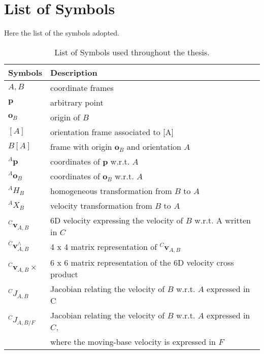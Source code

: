 
\chapter*{List of Symbols}
\label{ch:List_of_symbols}
Here the list of the symbols adopted.

\begin{table}[h]
    \centering
    \caption{List of Symbols used throughout the thesis.}
    \renewcommand{\arraystretch}{1.5} %
    \begin{tabular}{@{}l@{\hspace{3cm}}l@{}}
    \toprule
    \textbf{Symbols} & \textbf{Description} \\
    \midrule
    ${A,B}$  & coordinate frames \\
    ${\mathbf{p}}$ & arbitrary point \\
    ${\mathbf{o}_B}$  & origin of $B$ \\
    ${[A]}$ & orientation frame associated to [A] \\
    ${B[A]}$  & frame with origin $\mathbf{o}_B$ and orientation $A$ \\
    ${{}^{A}\mathbf{p}}$ & coordinates of $\mathbf{p}$ w.r.t. $A$ \\
    ${{}^{A}\mathbf{o}_B}$  & coordinates of $\mathbf{o}_B$ w.r.t. $A$ \\
    ${{}^{A} H_B}$  & homogeneous transformation from $B$ to $A$ \\
    ${{}^{A} X_B}$  & velocity transformation from $B$ to $A$ \\
    ${}^{C} \mathbf{v}_{A,B}$  & 6D velocity expressing the velocity of $B$ w.r.t. A written in $C$ \\
    ${}^{C} \mathbf{v}^{\wedge{}}_{A,B}$  & 4 x 4 matrix representation of ${}^{C} \mathbf{v}_{A,B}$  \\
    ${}^{C} \mathbf{v}_{A,B}\times$  & 6 x 6 matrix representation of the 6D velocity cross product  \\
    ${}^{C}J_{A,B}$  & Jacobian relating the velocity of $B$ w.r.t. $A$ expressed in C \\
    ${}^{C}J_{A,B/F}$  & Jacobian relating the velocity of $B$ w.r.t. $A$ expressed in $C$, \\ & where the moving-base velocity is expressed in $F$ \\
     \bottomrule
    \end{tabular}
\end{table}